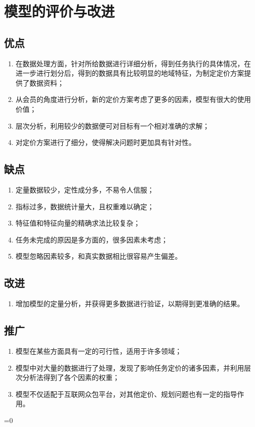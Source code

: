\documentclass{article}
\begin{document}
\fi
\clearpage
\section{模型的评价与改进}
\subsection{优点}
\begin{enumerate}
	\item 在数据处理方面，针对所给数据进行详细分析，得到任务执行的具体情况，在进一步进行划分后，得到的数据具有比较明显的地域特征，为制定定价方案提供了数据资料；
	\item 从会员的角度进行分析，新的定价方案考虑了更多的因素，模型有很大的使用价值；
	\item 层次分析，利用较少的数据便可对目标有一个相对准确的求解；
	\item 对定价方案进行了细分，使得解决问题时更加具有针对性。	
\end{enumerate}
\subsection{缺点}
\begin{enumerate}
	\item 定量数据较少，定性成分多，不易令人信服；
	\item 指标过多，数据统计量大，且权重难以确定；
	\item 特征值和特征向量的精确求法比较复杂；
	\item 任务未完成的原因是多方面的，很多因素未考虑；
	\item 模型忽略因素较多，和真实数据相比很容易产生偏差。
\end{enumerate}
\subsection{改进}
\begin{enumerate}
	\item 增加模型的定量分析，并获得更多数据进行验证，以期得到更准确的结果。
\end{enumerate}
\subsection{推广}
\begin{enumerate}
	\item 模型在某些方面具有一定的可行性，适用于许多领域；
	\item 模型中对大量的数据进行了处理，发现了影响任务定价的诸多因素，并利用层次分析法得到了各个因素的权重；
	\item 模型不仅适配于互联网众包平台，对其他定价、规划问题也有一定的指导作用。
\end{enumerate}
\ifnum{}=0
	
\end{document}
